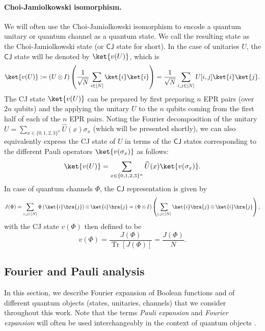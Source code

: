 \documentclass[11pt]{article}
\newcommand{\CJ}{\textsf{CJ}}
\theoremstyle{plain}
\DeclareMathOperator{\Tr}{Tr}
\theoremstyle{plain}
\theoremstyle{definition}
\theoremstyle{remark}
\theoremstyle{named}
\begin{document}
\paragraph{Choi-Jamiolkowski isomorphism.}
We will often use the Choi-Jamiolkowski isomorphism to encode a quantum unitary or quantum channel as a quantum state. We call the resulting state as the Choi-Jamiolkowski state (or $\CJ$ state for short). 
In the case of unitaries $U$, the $\CJ$ state will be denoted by $\ket{v(U)}$, which is
\begin{equation}
    \ket{v(U)} := (U \mathop{\otimes} I) \left(\frac{1}{\sqrt{N}} \sum_{i \in [N]} \ket{i} \ket{i} \right) = \frac{1}{\sqrt{N}} \sum_{i,j \in [N]} U[i,j] \ket{i} \ket{j}.
    \label{eq:CJ_state}
\end{equation}
The CJ state $\ket{v(U)}$ can be prepared by first preparing $n$ EPR pairs (over $2n$ qubits) and the applying the unitary $U$ to the $n$ qubits coming from the first half of each of the $n$ EPR pairs. Noting the Fourier decomposition of the unitary $U = \sum_{x \in \{0,1,2,3\}^n} \widehat{U}(x) \sigma_x$ (which will be presented shortly), we can also equivalently express the CJ state of $U$ in terms of the $\CJ$ states corresponding to the different Pauli operators $\ket{v(\sigma_x)}$ as follows:
\begin{equation}\label{eq:CJBellExpansion}
    \ket{v(U)} = \sum_{x \in \{0,1,2,3\}^n} \widehat{U}(x) \ket{v(\sigma_x)}.
\end{equation} 
In case of quantum channels $\Phi$, the $\CJ$ representation is given by
\begin{equation}
    J(\Phi) = \sum_{i,j \in [N]} \Phi \left(\ket{i}\bra{j}\right) \mathop{\otimes} \ket{i}\bra{j} = (\Phi \mathop{\otimes} I) \left(\sum_{i,j \in [N]} \ket{i}\bra{j} \mathop{\otimes} \ket{i}\bra{j} \right),
\end{equation}
with the CJ state $v(\Phi)$ then defined to be
\begin{equation}
    v(\Phi) = \frac{J(\Phi)}{\Tr[J(\Phi)]}=\frac{J(\Phi)}{N}.
    \label{eq:choi_state_channel}
\end{equation}




\subsection{Fourier and Pauli analysis}
In this section, we describe Fourier expansion of Boolean functions and of different quantum objects (states, unitaries, channels) that we consider throughout this work. Note that the terms \emph{Pauli expansion} and \emph{Fourier expansion} will often be used interchangeably in the context of quantum objects .
\end{document}
